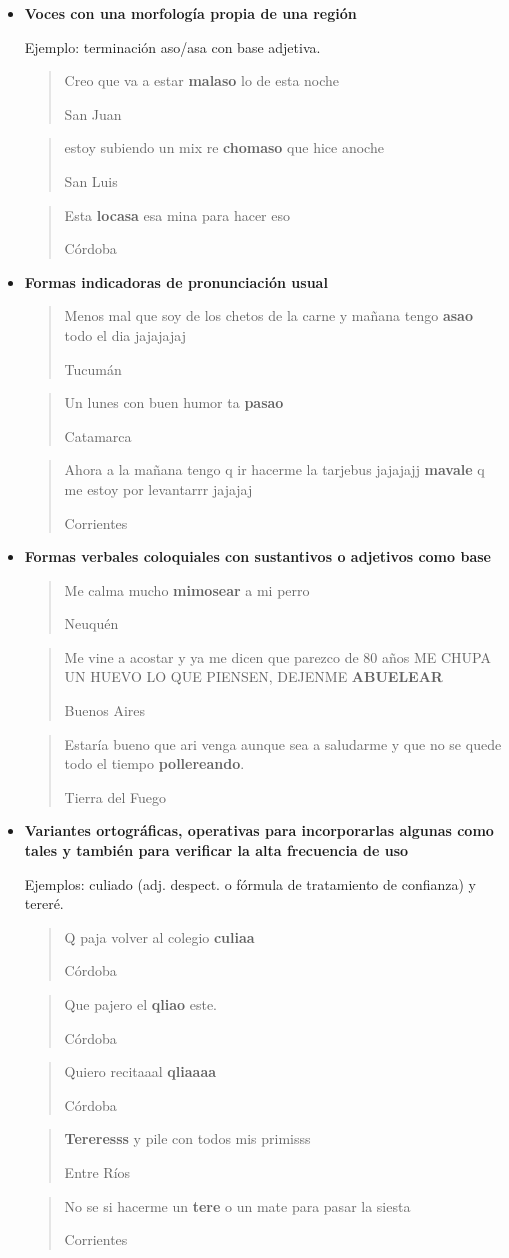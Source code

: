 \begin{itemize}
\item \textbf{Voces con una morfología propia de una región}

Ejemplo: terminación aso/asa con base adjetiva.

  \blockquote[San Juan]{Creo que va a estar \textbf{malaso} lo de esta noche } 

  \blockquote[San Luis]{estoy subiendo un mix re \textbf{chomaso} que hice anoche }

  \blockquote[Córdoba]{Esta \textbf{locasa} esa mina para hacer eso}

\item \textbf{Formas indicadoras de pronunciación usual}

  \blockquote[Tucumán]{Menos mal que soy de los chetos de la carne y mañana tengo \textbf{asao} todo el dia jajajajaj}

  \blockquote[Catamarca]{Un lunes con buen humor ta \textbf{pasao} }

  \blockquote[Corrientes]{Ahora a la mañana tengo q ir hacerme la tarjebus jajajajj \textbf{mavale} q me estoy por levantarrr jajajaj}

\item \textbf{Formas verbales coloquiales con sustantivos o adjetivos como base}

  \blockquote[Neuquén]{Me calma mucho \textbf{mimosear} a mi perro }

  \blockquote[Buenos Aires]{Me vine a acostar y ya me dicen que parezco de 80 años ME CHUPA UN HUEVO LO QUE PIENSEN, DEJENME \textbf{ABUELEAR} }

  \blockquote[Tierra del Fuego]{Estaría bueno que ari venga aunque sea a saludarme y que no se quede todo el tiempo \textbf{pollereando}.}

\item \textbf{Variantes ortográficas, operativas para incorporarlas algunas como tales y también para verificar la alta frecuencia de uso}

Ejemplos: culiado (adj. despect. o fórmula de tratamiento de confianza) y tereré.

  \blockquote[Córdoba]{Q paja volver al colegio \textbf{culiaa}}

  \blockquote[Córdoba]{Que pajero el \textbf{qliao} este.}

  \blockquote[Córdoba]{Quiero recitaaal \textbf{qliaaaa}}

  \blockquote[Entre Ríos]{\textbf{Tereresss} y pile con todos mis primisss}

  \blockquote[Corrientes]{No se si hacerme un \textbf{tere} o un mate para pasar la siesta}


\end{itemize}
